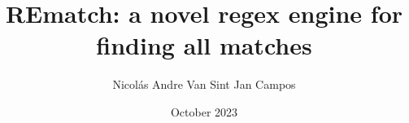 
\title[REmatch: a novel regex engine for finding all matches]
{\bf REmatch: a novel regex engine for finding all matches}
\author[Nicolás Andre Van Sint Jan Campos]{Nicolás Andre Van Sint Jan Campos}

\address{Escuela de Ingeniería\\
Pontificia Universidad Católica de Chile\\
Vicuña Mackenna 4860\\
Santiago, Chile\\
{\it Tel.\/} : 56 (2) 354-2000}

\subject                            {Computer Science}
\date                               {October 2023}
\dedication                         {To my parents.}


\NoChapterPageNumber
\fancyhf{}
\fancyfoot[C]{\fontsize{11pt}{11pt}\selectfont\thepage}
\maketitle
\topmargin -20mm
\headheight 7mm
\headsep 20mm
\oddsidemargin 7.3mm



